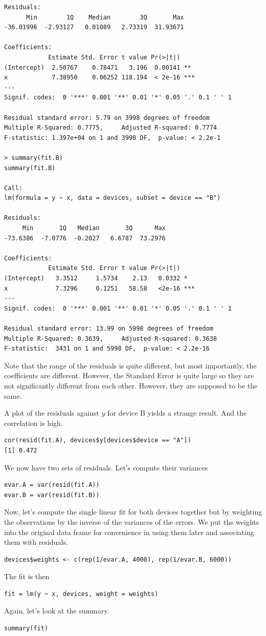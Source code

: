 \documentclass{article}
\begin{document}
\begin{description}
\begin{verbatim}
Residuals:
      Min        1Q    Median        3Q       Max 
-36.01996  -2.93127   0.01089   2.73319  31.93671 

Coefficients:
            Estimate Std. Error t value Pr(>|t|)    
(Intercept)  2.50767    0.78471   3.196  0.00141 ** 
x            7.38950    0.06252 118.194  < 2e-16 ***
---
Signif. codes:  0 '***' 0.001 '**' 0.01 '*' 0.05 '.' 0.1 ' ' 1 

Residual standard error: 5.79 on 3998 degrees of freedom
Multiple R-Squared: 0.7775,     Adjusted R-squared: 0.7774 
F-statistic: 1.397e+04 on 1 and 3998 DF,  p-value: < 2.2e-1

> summary(fit.B)
summary(fit.B)

Call:
lm(formula = y ~ x, data = devices, subset = device == "B")

Residuals:
     Min       1Q   Median       3Q      Max 
-73.6386  -7.0776  -0.2027   6.6787  73.2976 

Coefficients:
            Estimate Std. Error t value Pr(>|t|)    
(Intercept)   3.3512     1.5734    2.13   0.0332 *  
x             7.3296     0.1251   58.58   <2e-16 ***
---
Signif. codes:  0 '***' 0.001 '**' 0.01 '*' 0.05 '.' 0.1 ' ' 1 

Residual standard error: 13.99 on 5998 degrees of freedom
Multiple R-Squared: 0.3639,     Adjusted R-squared: 0.3638 
F-statistic:  3431 on 1 and 5998 DF,  p-value: < 2.2e-16 
\end{verbatim}

Note that the range of the residuals is quite different, but most
importantly, the coefficients are different.  However, the Standard
Error is quite large so they are not significantly different from each
other. However, they are supposed to be the same.


A plot of the residuals against $y$ for device B yields a strange
result.  And the correlation is high.
\begin{verbatim}
cor(resid(fit.A), devices$y[devices$device == "A"])
[1] 0.472
\end{verbatim}

We now have two sets of residuals.
Let's compute their variances
\begin{verbatim}
evar.A = var(resid(fit.A))
evar.B = var(resid(fit.B))
\end{verbatim}
Now, let's compute the single linear fit 
for both devices together but by weighting the
observations by the inverse of the variances of the
errors. We put the weights into the original data frame
for convenience in using them later and associating them
with residuals.
\begin{verbatim}
devices$weights <- c(rep(1/evar.A, 4000), rep(1/evar.B, 6000))
\end{verbatim}
The fit is then
\begin{verbatim}
fit = lm(y ~ x, devices, weight = weights)
\end{verbatim}
Again, let's look at the summary.
\begin{verbatim}
summary(fit)


\end{verbatim}
\end{description}
\end{document}
